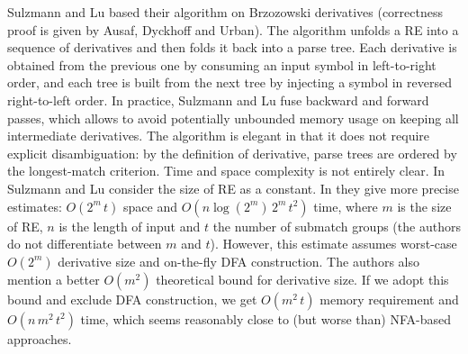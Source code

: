 \documentclass[AMA,STIX1COL]{WileyNJD-v2}
\begin{document}
Sulzmann and Lu based their algorithm on Brzozowski derivatives \cite{SL14}
(correctness proof is given by Ausaf, Dyckhoff and Urban\cite{ADU16}).
The algorithm unfolds a RE into a sequence of derivatives
and then folds it back into a parse tree.
Each derivative is obtained from the previous one by consuming an input symbol in left-to-right order,
and each tree is built from the next tree by injecting a symbol in reversed right-to-left order.
In practice, Sulzmann and Lu fuse backward and forward passes,
which allows to avoid potentially unbounded memory usage on keeping all intermediate derivatives.
The algorithm is elegant in that it does not require explicit disambiguation:
by the definition of derivative, parse trees are ordered by the longest-match criterion.
Time and space complexity is not entirely clear.
In \cite{SL14} Sulzmann and Lu consider the size of RE as a constant.
In \cite{SL13} they give more precise estimates: $O(2^m \, t)$ space and $O(n \log(2^m) \, 2^m \, t^2)$ time,
where $m$ is the size of RE,
$n$ is the length of input
and $t$ the number of submatch groups (the authors do not differentiate between $m$ and $t$).
However, this estimate assumes worst-case $O(2^m)$ derivative size and on-the-fly DFA construction.
The authors also mention a better $O(m^2)$ theoretical bound for derivative size.
If we adopt this bound and exclude DFA construction, we get $O(m^2 \, t)$ memory requirement and $O(n \, m^2 \, t^2)$ time,
which seems reasonably close to (but worse than) NFA-based approaches.
\\
\end{document}
